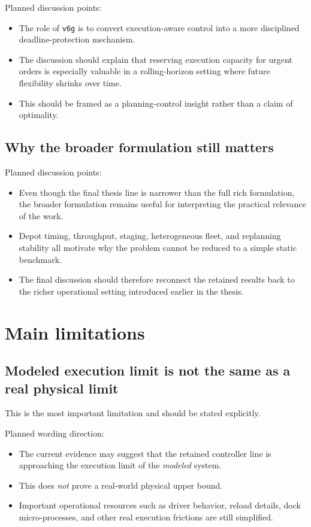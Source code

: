 Planned discussion points:
\begin{itemize}
    \item The role of \texttt{v6g} is to convert execution-aware control into a more disciplined deadline-protection mechanism.
    \item The discussion should explain that reserving execution capacity for urgent orders is especially valuable in a rolling-horizon setting where future flexibility shrinks over time.
    \item This should be framed as a planning-control insight rather than a claim of optimality.
\end{itemize}

\subsection{Why the broader formulation still matters}

Planned discussion points:
\begin{itemize}
    \item Even though the final thesis line is narrower than the full rich formulation, the broader formulation remains useful for interpreting the practical relevance of the work.
    \item Depot timing, throughput, staging, heterogeneous fleet, and replanning stability all motivate why the problem cannot be reduced to a simple static benchmark.
    \item The final discussion should therefore reconnect the retained results back to the richer operational setting introduced earlier in the thesis.
\end{itemize}

\section{Main limitations}

\subsection{Modeled execution limit is not the same as a real physical limit}

This is the most important limitation and should be stated explicitly.

Planned wording direction:
\begin{itemize}
    \item The current evidence may suggest that the retained controller line is approaching the execution limit of the \emph{modeled} system.
    \item This does \emph{not} prove a real-world physical upper bound.
    \item Important operational resources such as driver behavior, reload details, dock micro-processes, and other real execution frictions are still simplified.
\end{itemize}

